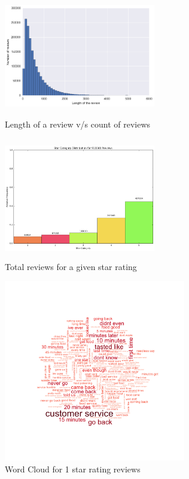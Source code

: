 \documentclass[paper=a4, fontsize=11pt]{scrartcl} %
\numberwithin{equation}{section} %
\numberwithin{figure}{section} %
\numberwithin{table}{section} %
\begin{document}
\begin{figure}[!htb]
\centering
\includegraphics[width=250px, height = 200px]{len_count.png}
\caption{Length of a review v/s count of reviews}
\label{length_count}
\end{figure} 

\begin{figure}[!htb]
\centering
\includegraphics[width=250px, height = 200px]{star_review_count.png}
\caption{Total reviews for a given star rating}
\label{star_distribution}
\end{figure} 

\begin{figure}[!htb]
\centering
\includegraphics[width=300px, height = 300px]{1_star_wordcloud_500k.png}
\caption{Word Cloud for 1 star rating reviews}
\label{wc1}
\end{figure} 
\end{document}
